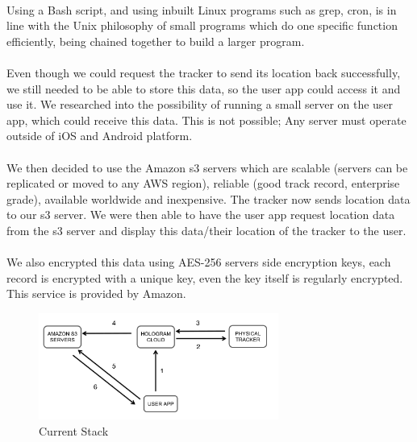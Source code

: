 \documentclass[12pt,a4paper]{article}
\begin{document}
        \paragraph{} Using a Bash script, and using inbuilt Linux programs such as grep, cron, is in line with the Unix philosophy of small programs which do one specific function efficiently, being chained together to build a larger program. 
        
        \paragraph{} Even though we could request the tracker to send its location back successfully, we still needed to be able to store this data, so the user app could access it and use it. We researched into the possibility of running a small server on the user app, which could receive this data. This is not possible; Any server must operate outside of iOS and Android platform.
        
        \paragraph{} We then decided to use the Amazon s3 servers which are scalable (servers can be replicated or moved to any AWS region), reliable (good track record, enterprise grade), available worldwide and inexpensive. The tracker now sends location data to our s3 server. We were then able to have the user app request location data from the s3 server and display this data/their location of the tracker to the user.
        
        \paragraph{} We also encrypted this data using AES-256 servers side encryption keys, each record is encrypted with a unique key, even the key itself is regularly encrypted. This service is provided by Amazon.
        
        \begin{figure}[H]
          \centering
          \includegraphics[width=0.7\textwidth]{../assets/design-implement-stage-current-stack.png}
          \caption{Current Stack}
          \label{fig:Current Stack}
        \end{figure}
\end{document}
